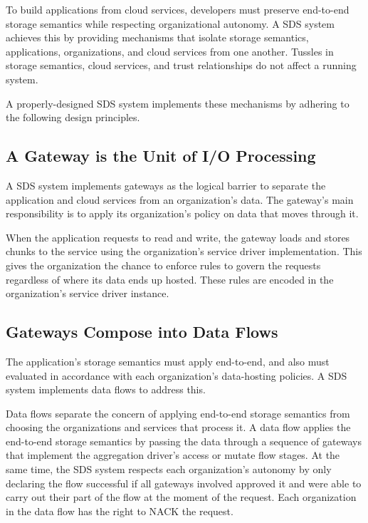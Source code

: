 
To build applications from cloud services, developers must preserve
end-to-end storage semantics while respecting organizational autonomy.
A SDS system achieves this by providing mechanisms that isolate storage semantics, applications,
organizations, and cloud services from one another.  Tussles in storage
semantics, cloud services, and trust relationships do not affect a running system.

A properly-designed SDS system implements these mechanisms by adhering to the
following design principles.

\subsection{A Gateway is the Unit of I/O Processing}

A SDS system implements gateways as
the logical barrier to separate the application and
cloud services from an organization's data.  The gateway's main
responsibility is to apply its organization's policy on data
that moves through it.

When the application requests to read and write, the
gateway loads and stores chunks to the service using the organization's
service driver implementation.  This gives the organization the chance to
enforce rules to govern the requests regardless of where its data
ends up hosted.  These rules are encoded in the organization's service driver
instance.

\subsection{Gateways Compose into Data Flows}

The application's storage semantics must apply end-to-end, and also must 
evaluated in accordance with each organization's data-hosting policies.
A SDS system implements data flows to address this.

Data flows separate the concern of applying end-to-end storage semantics from 
choosing the organizations and services that process it.  A data flow applies
the end-to-end storage semantics by passing the data through a sequence of
gateways that implement the aggregation driver's access or mutate flow stages.
At the same time, the SDS system respects each organization's autonomy by
only declaring the flow successful if all gateways involved approved it
and were able to carry out their part of the flow at the moment of the request.
Each organization in the data flow has the right to NACK the request.

